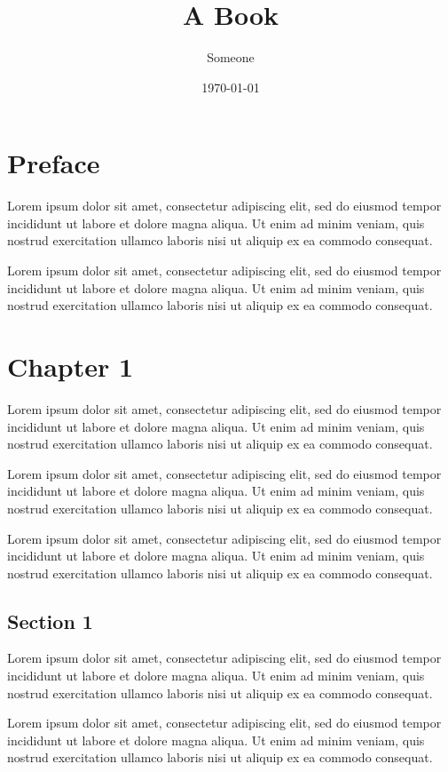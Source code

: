 \documentclass{book}
\title{A Book}
\author{Someone}
\date{\today}
\begin{document}
\frontmatter
\maketitle
\tableofcontents
\chapter{Preface}
Lorem ipsum dolor sit amet, consectetur adipiscing elit, sed do eiusmod tempor incididunt ut labore et dolore magna aliqua. Ut enim ad minim veniam, quis nostrud exercitation ullamco laboris nisi ut aliquip ex ea commodo consequat.

Lorem ipsum dolor sit amet, consectetur adipiscing elit, sed do eiusmod tempor incididunt ut labore et dolore magna aliqua. Ut enim ad minim veniam, quis nostrud exercitation ullamco laboris nisi ut aliquip ex ea commodo consequat.

\mainmatter
\chapter{Chapter 1}
Lorem ipsum dolor sit amet, consectetur adipiscing elit, sed do eiusmod tempor incididunt ut labore et dolore magna aliqua. Ut enim ad minim veniam, quis nostrud exercitation ullamco laboris nisi ut aliquip ex ea commodo consequat.

Lorem ipsum dolor sit amet, consectetur adipiscing elit, sed do eiusmod tempor incididunt ut labore et dolore magna aliqua. Ut enim ad minim veniam, quis nostrud exercitation ullamco laboris nisi ut aliquip ex ea commodo consequat.

Lorem ipsum dolor sit amet, consectetur adipiscing elit, sed do eiusmod tempor incididunt ut labore et dolore magna aliqua. Ut enim ad minim veniam, quis nostrud exercitation ullamco laboris nisi ut aliquip ex ea commodo consequat.

\section{Section 1}
Lorem ipsum dolor sit amet, consectetur adipiscing elit, sed do eiusmod tempor incididunt ut labore et dolore magna aliqua. Ut enim ad minim veniam, quis nostrud exercitation ullamco laboris nisi ut aliquip ex ea commodo consequat.

Lorem ipsum dolor sit amet, consectetur adipiscing elit, sed do eiusmod tempor incididunt ut labore et dolore magna aliqua. Ut enim ad minim veniam, quis nostrud exercitation ullamco laboris nisi ut aliquip ex ea commodo consequat.
\end{document}
